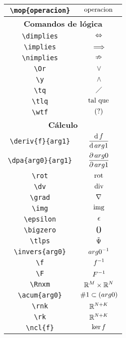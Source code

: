 \begin{longtable}{|c|c|}
 \hline\verb|\mop{operacion}| & $\displaystyle\mathrm{operacion}\,$ \\ \hline 
\multicolumn{2}{|c|}{\textbf{Comandos de lógica}} \\ \hline 
\verb|\dimplies| & $\displaystyle\Leftrightarrow$ \\ \hline 
\verb|\implies| & $\displaystyle\implies$ \\ \hline 
\verb|\nimplies| & $\displaystyle\nRightarrow$ \\ \hline 
\verb|\Or| & $\displaystyle\vee$ \\ \hline 
\verb|\y| & $\displaystyle\wedge$ \\ \hline 
\verb|\tq| & $\displaystyle\;\diagup\;$ \\ \hline 
\verb|\tlq| & $\displaystyle\text{ tal que }$ \\ \hline 
\verb|\wtf| & $\displaystyle(?)$ \\ \hline 
\multicolumn{2}{|c|}{\textbf{Cálculo}} \\ \hline 
\verb|\deriv{f}{arg1}| & $\displaystyle\deriv{f}{arg1}$ \\ \hline 
\verb|\dpa{arg0}{arg1}| & $\displaystyle\frac{\partial\,arg0}{\partial\, arg1}$ \\ \hline 
\verb|\rot| & $\displaystyle\operatorname{rot}$ \\ \hline 
\verb|\dv| & $\displaystyle\operatorname{div}$ \\ \hline 
\verb|\grad| & $\displaystyle\nabla$ \\ \hline 
\verb|\img| & $\displaystyle\operatorname{img}$ \\ \hline 
\verb|\epsilon| & $\displaystyle\epsilon$ \\ \hline 
\verb|\bigzero| & $\displaystyle\text{\Large 0}$ \\ \hline 
\verb|\tlps| & $\displaystyle\tilde{\Psi}$ \\ \hline 
\verb|\invers{arg0}| & $\displaystyle arg0 ^ {-1}$ \\ \hline 
\verb|\f| & $\displaystyle f ^ {-1}$ \\ \hline 
\verb|\F| & $\displaystyle F ^ {-1}$ \\ \hline 
\verb|\Rnxm| & $\displaystyle\mathbb{R}^M\times\mathbb{R}^N$ \\ \hline 
\verb|\acum{arg0}| & $\displaystyle\acum{arg0}$ \\ \hline 
\verb|\rnk| & $\displaystyle\mathbb{R}^{N+K}$ \\ \hline 
\verb|\rk| & $\displaystyle\mathbb{R}^{N+K}$ \\ \hline 
\verb|\ncl{f}| & $\displaystyle\ker f$ \\ \hline 

\end{longtable}
